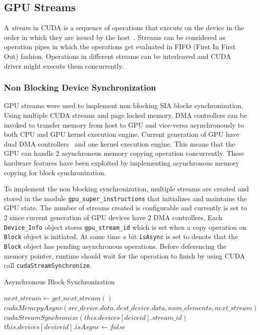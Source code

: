 \subsection{GPU Streams}
A \textit{stream} in CUDA is a sequence of operations that execute on the device
in the order in which they are issued by the host~\cite{overlapdatatransfer}.
Streams can be considered as operation pipes in which the operations get evaluated in
FIFO (First In First Out) fashion. Operations in different streams can be interleaved
and CUDA driver might execute them concurrently.

\subsubsection{Non Blocking Device Synchronization}\label{nonblockdevicesync}
GPU streams were used to implement non blocking SIA blocks synchronization. Using
multiple CUDA streams and page locked memory, DMA controllers can be invoked to
transfer memory from host to GPU and vice-versa asynchronously to both CPU and GPU
kernel execution engine. Current generation of GPU have dual DMA
controllers~\cite{teslaspecs}\cite{teslakspecs} and one kernel execution engine.
This means that the GPU can handle 2 asynchronous memory copying operation concurrently.
These hardware features have been exploited by implementing asynchronous memory
copying for block synchronization.

To implement the non blocking synchronization, multiple streams are created and
stored in the module \texttt{gpu\_super\_instructions} that initializes and
maintains the GPU state. The number of streams created is configurable and currently
is set to 2 since current generation of GPU devices have 2 DMA controllers. Each
\texttt{Device\_Info} object stores \texttt{gpu\_stream\_id} which is set when a
copy operation on \texttt{Block} object is initiated. At same time a bit
\texttt{isAsync} is set to denote that the \texttt{Block} object has pending
asynchronous operations. Before deferencing the memory pointer, runtime should
wait for the operation to finish by using CUDA call \texttt{cudaStreamSynchronize}.

\begin{algorithm} {Asynchronous Block Synchronization}
  \singlespacing

  \begin{algorithmic}[1]
    \State $next\_stream \gets get\_next\_stream()$
    \State $cudaMemcpyAsync(src\_device.data, dest\_device.data, num\_elements, next\_stream)$
    \EndFunction
    \\
    \State $cudaStreamSynchronize(this.devices[deiceid].stream\_id)$
    \State $this.devices[deviceid].isAsync \gets false$
    \EndIf
    \State {}
    \EndFunction
  \end{algorithmic}
\end{algorithm}

